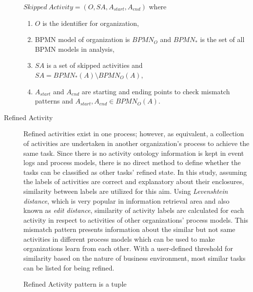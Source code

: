 \begin{description}
\begin{definition}
		${Skipped\ Activity} = (O, SA, A_{start}, A_{end}) $ where 
		\begin{enumerate}
		  \item $O$ is the identifier for organization,
		  \item BPMN model of organization is $BPMN_{O}$ and $BPMN_{*}$ is the set of all BPMN models in analysis,
		  \item $SA$ is a set of skipped activities and $SA =  BPMN_{*}(A) \setminus BPMN_{O}(A)$,
		  \item $A_{start}$ and $A_{end}$ are starting and ending points to check mismatch patterns and $A_{start}, A_{end} \in BPMN_{O}(A)$.
		\end{enumerate}
		\end{definition}
  \item[Refined Activity] Refined activities exist in one process; however, as equivalent, a collection of activities are undertaken in another organization's process to achieve the same task. Since there is no activity ontology information is kept in event logs and process models, there is no direct method to define whether the tasks can be classified as other tasks' refined state. In this study, assuming the labels of activities are correct and explanatory about their enclosures, similarity between labels are utilized for this aim. Using \textit{Levenshtein distance}, which is very popular in information retrieval area and also known as \textit{edit distance}, similarity of activity labels are calculated for each activity in respect to activities of other organizations' process models. This mismatch pattern presents information about the similar but not same activities in different process models which can be used to make organizations learn from each other. With a user-defined threshold for similarity based on the nature of business environment, most similar tasks can be listed for being refined.
		\theoremstyle{definition}
		\begin{definition}
		Refined Activity pattern is a tuple 


\end{definition}
\end{description}
